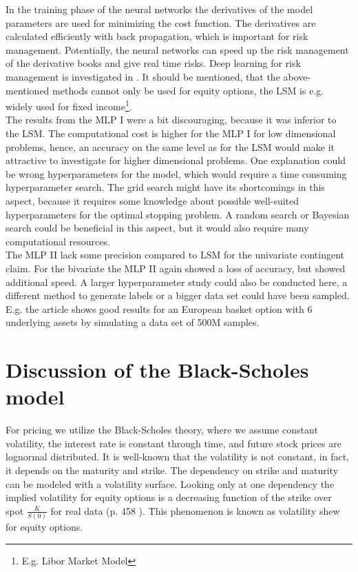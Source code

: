 In the training phase of the neural networks the derivatives of the model parameters are used for minimizing the cost function. The derivatives are calculated efficiently with back propagation, which is important for risk management. Potentially, the neural networks can speed up the risk management of the derivative books and give real time risks. Deep learning for risk management is investigated in \parencite{AntoineSavine}. It should be mentioned, that the above-mentioned methods cannot only be used for equity options, the LSM is e.g. widely used for fixed income\footnote{E.g. Libor Market Model}.\\

The results from the MLP I were a bit discouraging, because it was inferior to the LSM. The computational cost is higher for the MLP I for low dimensional problems, hence, an accuracy on the same level as for the LSM would make it attractive to investigate for higher dimensional problems. One explanation could be wrong hyperparameters for the model, which would require a time consuming hyperparameter search. The grid search might have its shortcomings in this aspect, because it requires some knowledge about possible well-suited hyperparameters for the optimal stopping problem. A random search or Bayesian search could be beneficial in this aspect, but it would also require many computational resources.\\

The MLP II lack some precision compared to LSM for the univariate contingent claim. For the bivariate the MLP II again showed a loss of accuracy, but showed additional speed. A larger hyperparameter study could also be conducted here, a different method to generate labels or a bigger data set could have been sampled. E.g. the article \parencite{FergusonRyan2018} shows good results for an European basket option with 6 underlying assets by simulating a data set of 500M samples. 

\section{Discussion of the Black-Scholes model}
For pricing we utilize the Black-Scholes theory, where we assume constant volatility, the interest rate is constant through time, and future stock prices are lognormal distributed. It is well-known that the volatility is not constant, in fact, it depends on the maturity and strike. The dependency on strike and maturity can be modeled with a volatility surface. Looking only at one dependency the implied volatility for equity options is a decreasing function of the strike over spot $\frac{K}{S(0)}$ for real data (p. 458 \parencite{Hull}). This phenomenon is known as volatility shew for equity options. \\

